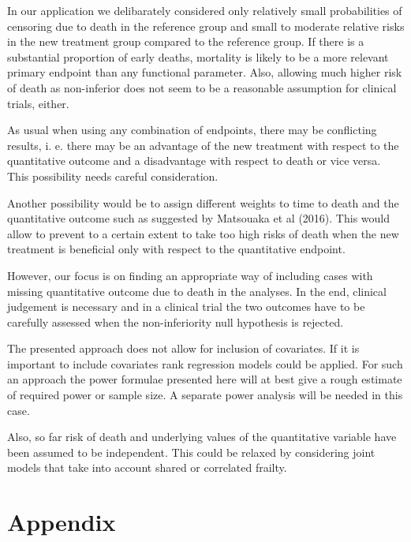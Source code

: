 \documentclass[bimj,fleqn]{w-art}\usepackage[]{graphicx}\usepackage[]{color}
\theoremstyle{plain}
\theoremstyle{definition}
\begin{document}
In our application we delibarately considered only relatively small probabilities
of censoring due to death in the reference group and small to moderate relative
risks in the new treatment group compared to the reference group. If there is a
substantial proportion of early deaths, mortality is likely to be a more relevant
primary endpoint than any functional parameter. Also, allowing much higher risk
of death as non-inferior does not seem to be a reasonable assumption for clinical
trials, either.

As usual when using any combination of endpoints, there may be conflicting
results, i. e. there may be an advantage of the new treatment with respect to
the quantitative outcome and a disadvantage with respect to death or vice versa.
This possibility needs careful consideration.

Another possibility would be to assign different weights to time to death and
the quantitative outcome such as suggested by Matsouaka et al (2016). This would
allow to prevent to a certain extent to take too high risks of death when the
new treatment is beneficial only with respect to the quantitative endpoint.

However, our focus is on finding an appropriate way of including cases with
missing quantitative outcome due to death in the analyses. In the end, clinical
judgement is necessary and in a clinical trial the two outcomes have to be
carefully assessed when the non-inferiority null hypothesis is rejected.

The presented approach does not allow for inclusion of covariates. If it is
important to include covariates rank regression models could be applied.
For such an approach the power formulae presented here will at best give a rough
estimate of required power or sample size. A separate power analysis will be
needed in this case.

Also, so far risk of death and underlying values of the quantitative variable
have been assumed to be independent. This could be relaxed by considering joint
models that take into account shared or correlated frailty.

\section*{Appendix}
\end{document}
